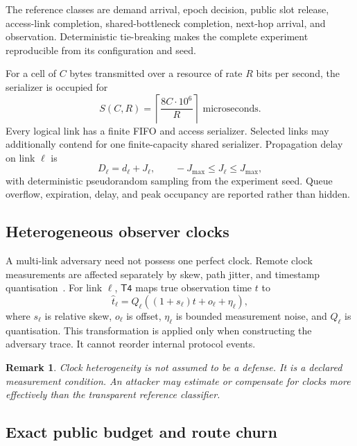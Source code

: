 \documentclass[11pt,oneside]{article}
\newcommand{\Tfour}{\ensuremath{\mathsf{T4}}}
\newtheorem{remark}{Remark}
\begin{document}
The reference classes are demand arrival, epoch decision, public slot release, access-link completion, shared-bottleneck completion, next-hop arrival, and observation. Deterministic tie-breaking makes the complete experiment reproducible from its configuration and seed.

For a cell of $C$ bytes transmitted over a resource of rate $R$ bits per second, the serializer is occupied for
\begin{equation}
  S(C,R)=\left\lceil\frac{8C\cdot10^6}{R}\right\rceil \text{ microseconds}.
\label{eq:t4serialization}
\end{equation}
Every logical link has a finite FIFO and access serializer. Selected links may additionally contend for one finite-capacity shared serializer. Propagation delay on link $\ell$ is
\begin{equation}
  D_\ell=d_\ell+J_\ell,
  \qquad -J_{\max}\le J_\ell\le J_{\max},
\label{eq:t4jitter}
\end{equation}
with deterministic pseudorandom sampling from the experiment seed. Queue overflow, expiration, delay, and peak occupancy are reported rather than hidden.

\subsection{Heterogeneous observer clocks}

A multi-link adversary need not possess one perfect clock. Remote clock measurements are affected separately by skew, path jitter, and timestamp quantisation~\cite{clockskew2008}. For link $\ell$, \Tfour{} maps true observation time $t$ to
\begin{equation}
  \widehat t_\ell=
  Q_\ell\!\left((1+s_\ell)t+o_\ell+\eta_\ell\right),
\label{eq:t4clock}
\end{equation}
where $s_\ell$ is relative skew, $o_\ell$ is offset, $\eta_\ell$ is bounded measurement noise, and $Q_\ell$ is quantisation. This transformation is applied only when constructing the adversary trace. It cannot reorder internal protocol events.

\begin{remark}
Clock heterogeneity is not assumed to be a defense. It is a declared measurement condition. An attacker may estimate or compensate for clocks more effectively than the transparent reference classifier.
\end{remark}

\subsection{Exact public budget and route churn}
\end{document}
